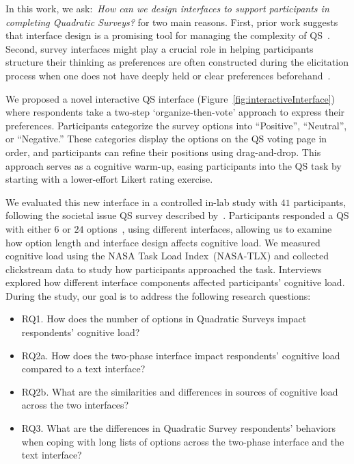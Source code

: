 In this work, we ask:~\textit{How can we design interfaces to support participants in completing Quadratic Surveys?} for two main reasons. First, prior work suggests that interface design is a promising tool for managing the complexity of QS~\cite{engstrom2020politics, weijtersEffectRatingScale2010, kierujVariationsResponseStyle2010, toepoelSmileysStarsHearts2019, farzandAestheticsEvaluatingResponse2024, xiaoTellMeYourself2020, pielotDidYouMisclick2024}. Second, survey interfaces might play a crucial role in helping participants structure their thinking as preferences are often constructed during the elicitation process when one does not have deeply held or clear preferences beforehand~\cite{lichtensteinConstructionPreference2006}.

We proposed a novel interactive QS interface (Figure~\ref{fig:interactiveInterface}) where respondents take a two-step `organize-then-vote' approach to express their preferences. Participants categorize the survey options into ``Positive'', ``Neutral'', or ``Negative.'' These categories display the options on the QS voting page in order, and participants can refine their positions using drag-and-drop. This approach serves as a cognitive warm-up, easing participants into the QS task by starting with a lower-effort Likert rating exercise.

We evaluated this new interface in a controlled in-lab study with $41$ participants, following the societal issue QS survey described by~\textcite{chengCanShowWhat2021}. Participants responded a QS with either $6$ or $24$ options~\cite{lenznerCognitiveBurdenSurvey2010, blessAskingDifficultQuestions1992}, using different interfaces, allowing us to examine how option length and interface design affects cognitive load. We measured cognitive load using the NASA Task Load Index~(NASA-TLX) and collected clickstream data to study how participants approached the task. Interviews explored how different interface components affected participants' cognitive load. During the study, our goal is to address the following research questions:

\begin{itemize}
    \item RQ1. How does the number of options in Quadratic Surveys impact respondents' cognitive load?
    \item RQ2a. How does the two-phase interface impact respondents' cognitive load compared to a text interface?
    \item RQ2b. What are the similarities and differences in sources of cognitive load across the two interfaces?
    \item RQ3. What are the differences in Quadratic Survey respondents' behaviors when coping with long lists of options across the two-phase interface and the text interface?
\end{itemize}


